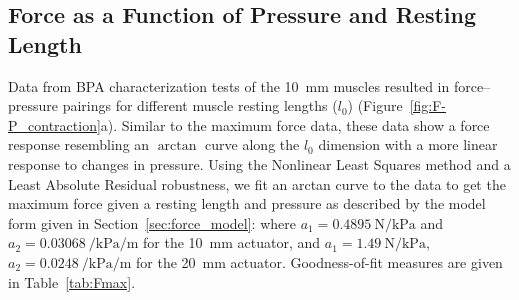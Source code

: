 
\subsection{Force as a Function of Pressure and Resting Length}

Data from BPA characterization tests of the \qty{10}{\mm} muscles resulted in force--pressure pairings for different muscle resting lengths ($l_0$) (Figure~\ref{fig:F-P_contraction}a). Similar to the maximum force data, these data show a force response resembling an $\arctan$ curve along the $l_0$ dimension  with a more linear response to changes in pressure. Using the Nonlinear Least Squares method and a Least Absolute Residual robustness, we fit an arctan curve to the data to get the maximum force given a resting length and pressure as described by the model form given in Section~\ref{sec:force_model}:
where $a_1 = \qty{0.4895}{\N\per\kPa}$  and $a_2=\qty{0.03068}{\per\kPa\per\m}$ for the \qty{10}{\mm} actuator, and \mbox{$a_1 = \qty{1.49}{\N\per\kPa}$,} $a_2=\qty{0.0248}{\per\kPa\per\m}$ for the \qty{20}{\mm} actuator. Goodness-of-fit measures are given in Table~\ref{tab:Fmax}. 



